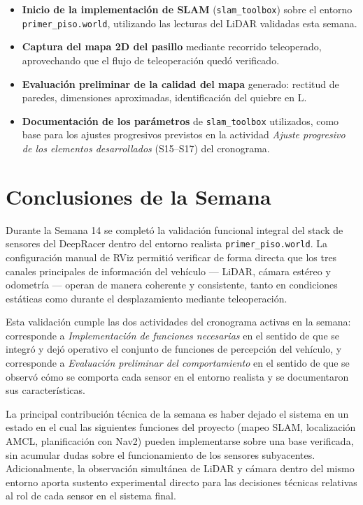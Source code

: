 \documentclass[12pt,letterpaper]{article}
\begin{document}
\begin{itemize}
    \item \textbf{Inicio de la implementación de SLAM} (\texttt{slam\_toolbox}) sobre el entorno \texttt{primer\_piso.world}, utilizando las lecturas del LiDAR validadas esta semana.
    \item \textbf{Captura del mapa 2D del pasillo} mediante recorrido teleoperado, aprovechando que el flujo de teleoperación quedó verificado.
    \item \textbf{Evaluación preliminar de la calidad del mapa} generado: rectitud de paredes, dimensiones aproximadas, identificación del quiebre en L.
    \item \textbf{Documentación de los parámetros} de \texttt{slam\_toolbox} utilizados, como base para los ajustes progresivos previstos en la actividad \textit{Ajuste progresivo de los elementos desarrollados} (S15--S17) del cronograma.
\end{itemize}

\section{Conclusiones de la Semana}

Durante la Semana 14 se completó la validación funcional integral del stack de sensores del DeepRacer dentro del entorno realista \texttt{primer\_piso.world}. La configuración manual de RViz permitió verificar de forma directa que los tres canales principales de información del vehículo --- LiDAR, cámara estéreo y odometría --- operan de manera coherente y consistente, tanto en condiciones estáticas como durante el desplazamiento mediante teleoperación.

Esta validación cumple las dos actividades del cronograma activas en la semana: corresponde a \textit{Implementación de funciones necesarias} en el sentido de que se integró y dejó operativo el conjunto de funciones de percepción del vehículo, y corresponde a \textit{Evaluación preliminar del comportamiento} en el sentido de que se observó cómo se comporta cada sensor en el entorno realista y se documentaron sus características.

La principal contribución técnica de la semana es haber dejado el sistema en un estado en el cual las siguientes funciones del proyecto (mapeo SLAM, localización AMCL, planificación con Nav2) pueden implementarse sobre una base verificada, sin acumular dudas sobre el funcionamiento de los sensores subyacentes. Adicionalmente, la observación simultánea de LiDAR y cámara dentro del mismo entorno aporta sustento experimental directo para las decisiones técnicas relativas al rol de cada sensor en el sistema final.
\end{document}
